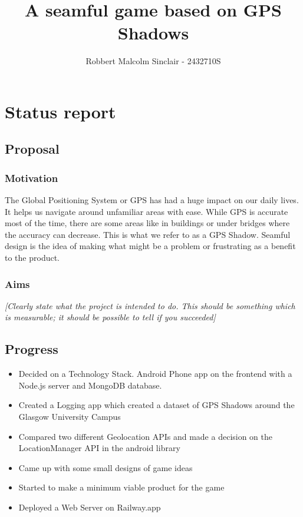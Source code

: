 \documentclass[11pt]{article}
\title{ A seamful game based on GPS Shadows }
\author{ Robbert Malcolm Sinclair - 2432710S }
\begin{document}
    \maketitle
    
    
     

\section{Status report}

\subsection{Proposal}\label{proposal}

\subsubsection{Motivation}\label{motivation}


The Global Positioning System or GPS has had a huge impact on our daily lives. It helps us navigate around unfamiliar areas with ease. While GPS is accurate most of the time, there
are some areas like in buildings or under bridges where the accuracy can decrease. This is what we refer to as a GPS Shadow. Seamful design is the idea of making what might be
a problem or frustrating as a benefit to the product. 


\subsubsection{Aims}\label{aims}

\emph{{[}Clearly state what the project is intended to do. This should
be something which is measurable; it should be possible to tell if you
succeeded{]}}

\subsection{Progress}\label{progress}

\begin{itemize}
    \tightlist
\item Decided on a Technology Stack. Android Phone app on the frontend with a Node.js server and MongoDB database. 
\item Created a Logging app which created a dataset of GPS Shadows around the Glasgow University Campus
\item Compared two different Geolocation APIs and made a decision on the LocationManager API in the android library
\item Came up with some small designs of game ideas
\item Started to make a minimum viable product for the game
\item Deployed a Web Server on Railway.app

\end{itemize}
\end{document}
